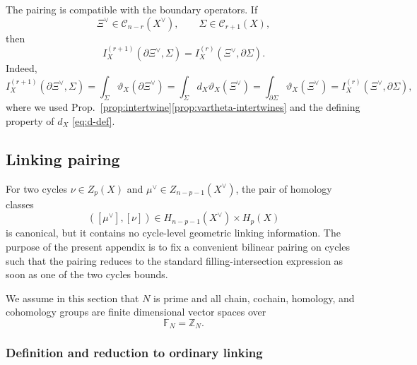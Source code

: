 The pairing is compatible with the boundary operators. If
\begin{equation}
	\Xi^\vee\in \mathcal C_{n-r}(X^\vee),
	\qquad
	\Sigma\in \mathcal C_{r+1}(X),
\end{equation}
then
\begin{equation}
	I_X^{(r+1)}(\partial \Xi^\vee,\Sigma)
	=
	I_X^{(r)}(\Xi^\vee,\partial \Sigma).
	\label{eq:intersection-Stokes}
\end{equation}
Indeed,
\begin{equation}
	I_X^{(r+1)}(\partial \Xi^\vee,\Sigma)
	=
	\int_\Sigma \vartheta_X(\partial \Xi^\vee)
	=
	\int_\Sigma d_X\vartheta_X(\Xi^\vee)
	=
	\int_{\partial\Sigma}\vartheta_X(\Xi^\vee)
	=
	I_X^{(r)}(\Xi^\vee,\partial\Sigma),
\end{equation}
where we used Prop.~\ref{prop:intertwine}\ref{prop:vartheta-intertwines} and the defining property of \(d_X\) \eqref{eq:d-def}.







\subsection{Linking pairing}
\label{app:linking}

For two cycles $\nu\in Z_p(X)$ and $\mu^\vee\in Z_{n-p-1}(X^\vee)$,
the pair of homology classes
\begin{equation}
	([\mu^\vee],[\nu])\in H_{n-p-1}(X^\vee)\times H_p(X)
\end{equation}
is canonical, but it contains no cycle-level geometric linking information. The purpose of
the present appendix is to fix a convenient bilinear pairing on cycles such that the pairing reduces to the standard filling-intersection expression as soon as one
of the two cycles bounds.

We assume in this section that $N$ is prime and all chain, cochain, homology, and cohomology groups are finite dimensional vector spaces over 
\begin{equation} 
	\mathbb F_N=\mathbb Z_N.
\end{equation}

\subsubsection{Definition and reduction to ordinary linking}


